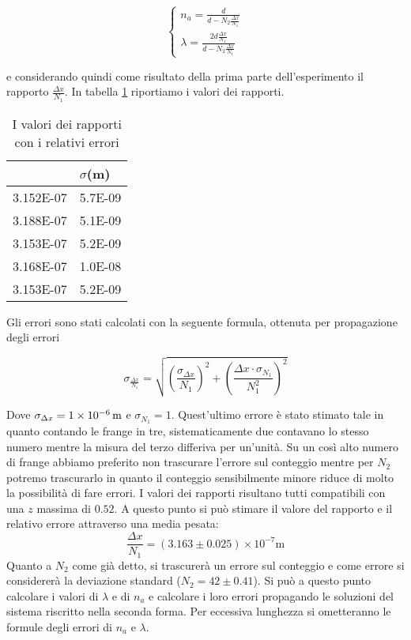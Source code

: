 \documentclass[a4paper,11pt]{article}
\newcommand{\ddfrac}[2]{\ensuremath{\frac{\displaystyle #1}{\displaystyle #2}}}
\begin{document}
	\begin{equation}
		\begin{cases}
			n_a = \ddfrac{d}{d - N_2 \frac{\Delta x}{N _1}} \\ \lambda = \ddfrac{2 d \frac{\Delta x}{N _1}}{d - N_2 \frac{\Delta x}{N _1}}
		\end{cases}
	\end{equation}

	e considerando quindi come risultato della prima parte dell'esperimento il rapporto $\frac{\Delta x}{N_1}$. In tabella \ref{rapporti} riportiamo i valori dei rapporti.
	
	\begin{table}[htbp]
  \centering
  \caption{I valori dei rapporti con i relativi errori}
    \begin{tabular}{rr}
    \bottomrule
    \rowcolor[rgb]{ .267,  .447,  .769} \multicolumn{1}{l}{\textcolor[rgb]{ 1,  1,  1}{\textbf{$\Delta x/N1$ (m)}}} & \multicolumn{1}{l}{\textcolor[rgb]{ 1,  1,  1}{\textbf{$\sigma$(m)}}} \\
    \toprule
    \rowcolor[rgb]{ .851,  .851,  .851} 3.152E-07 & 5.7E-09 \\
    3.188E-07 & 5.1E-09 \\
    \rowcolor[rgb]{ .851,  .851,  .851} 3.153E-07 & 5.2E-09 \\
    3.168E-07 & 1.0E-08 \\
    \rowcolor[rgb]{ .851,  .851,  .851} 3.153E-07 & 5.2E-09 \\
    \toprule
    \end{tabular}%
  \label{rapporti}%
\end{table}%

	Gli errori sono stati calcolati con la seguente formula, ottenuta per propagazione degli errori
	
	\begin{equation}
	\sigma _{\frac{\Delta x}{N _1}} = \sqrt{\left( \frac{\sigma _{\Delta x}}{N_1} \right) ^2 + \left( \frac{\Delta x \cdot \sigma _{N_1}}{N_1 ^2} \right) ^2}
	\end{equation}
	
	Dove $\sigma _{\Delta x} = \SI{1E-06}{m}$ e $\sigma _{N_1} = 1$. Quest'ultimo errore è stato stimato tale in quanto contando le frange in tre, sistematicamente due contavano lo stesso numero mentre la misura del terzo differiva per un'unità. Su un così alto numero di frange abbiamo preferito non trascurare l'errore sul conteggio mentre per $N _2$ potremo trascurarlo in quanto il conteggio sensibilmente minore riduce di molto la possibilità di fare errori. I valori dei rapporti risultano tutti compatibili con una $z$ massima di $0.52$.
	A questo punto si può stimare il valore del rapporto e il relativo errore attraverso una media pesata: $$\frac{\Delta x}{N _1} = (\num{3.163} \pm \num{0.025}) \times 10 ^{-7} \text{m}$$ Quanto a $N _2$ come già detto, si trascurerà un errore sul conteggio e come errore si considererà la deviazione standard ($N _2 = 42 \pm 0.41$). Si può a questo punto calcolare i valori di $\lambda$ e di $n _a$ e calcolare i loro errori propagando le soluzioni del sistema riscritto nella seconda forma. Per eccessiva lunghezza si ometteranno le formule degli errori di $n _a$ e $\lambda$.
	
\end{document}
